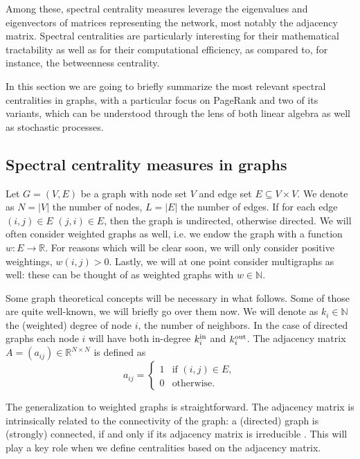 \documentclass[sn-mathphys-ay]{sn-jnl}%
\newcommand{\R}{\mathbb{R}}
\newcommand{\N}{\mathbb{N}}
\theoremstyle{thmstyleone}%
\theoremstyle{thmstyletwo}%
\theoremstyle{thmstylethree}%
\begin{document}
Among these, spectral centrality measures leverage the eigenvalues and eigenvectors of matrices representing the network, most notably the adjacency matrix. Spectral centralities are particularly interesting for their mathematical tractability as well as for their computational efficiency, as compared to, for instance, the betweenness centrality.

In this section we are going to briefly summarize the most relevant spectral centralities in graphs, with a particular focus on PageRank and two of its variants, which can be understood through the lens of both linear algebra as well as stochastic processes.


\subsection{Spectral centrality measures in graphs}

Let $G=(V,E)$ be a graph with node set $V$ and edge set $E\subseteq V\times V$. We denote as $N=|V|$ the number of nodes, $L=|E|$ the number of edges. If for each edge $(i,j)\in E$ $(j,i)\in E$, then the graph is undirected, otherwise directed. We will often consider weighted graphs as well, i.e. we endow the graph with a function $w:E\rightarrow \R$. For reasons which will be clear soon, we will only consider positive weightings, $w(i,j)>0$. Lastly, we will at one point consider multigraphs as well: these can be thought of as weighted graphs with $w\in \N$.


Some graph theoretical concepts will be necessary in what follows. Some of those are quite well-known, we will briefly go over them now. We will denote as $k_i\in\N$ the (weighted) degree of node $i$, the number of neighbors. In the case of directed graphs each node $i$ will have both in-degree $k^{\rm in}_i$ and $k^{\rm out}_i$. The adjacency matrix $A=(a_{ij})\in\R^{N\times N}$ is defined as
\begin{equation}
	a_{ij} = \begin{cases}
		1 & \text{if } (i,j) \in E,\\
		0 & \text{otherwise.}
	\end{cases}
\end{equation}

The generalization to weighted graphs is straightforward. The adjacency matrix is intrinsically related to the connectivity of the graph: a (directed) graph is (strongly) connected, if and only if its adjacency matrix is irreducible 
\cite{meyer2001matrix}. This will play a key role when we define centralities based on the adjacency matrix.
\end{document}
